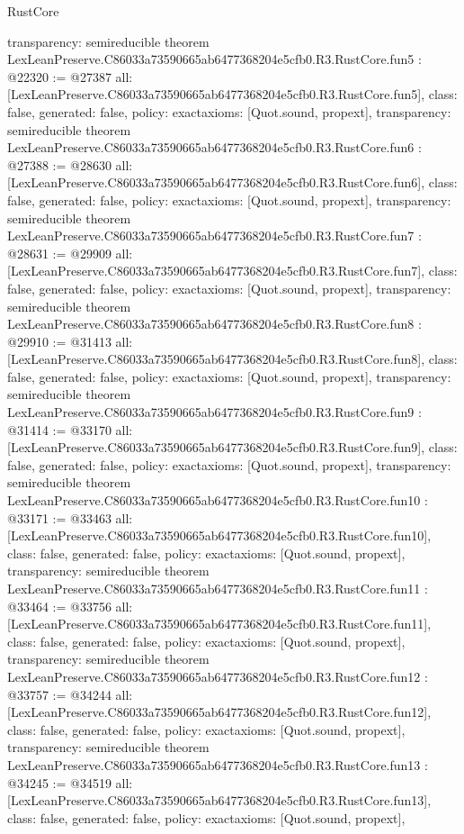 \begin{lexlean}{RustCore}
\begin{coremodule}
{  transparency: semireducible
}
theorem LexLeanPreserve.C86033a73590665ab6477368204e5cfb0.R3.RustCore.fun5 : @22320 := @27387 {
  all: [LexLeanPreserve.C86033a73590665ab6477368204e5cfb0.R3.RustCore.fun5],
  class: false,
  generated: false,
  policy: exact{axioms: [Quot.sound, propext]},
  transparency: semireducible
}
theorem LexLeanPreserve.C86033a73590665ab6477368204e5cfb0.R3.RustCore.fun6 : @27388 := @28630 {
  all: [LexLeanPreserve.C86033a73590665ab6477368204e5cfb0.R3.RustCore.fun6],
  class: false,
  generated: false,
  policy: exact{axioms: [Quot.sound, propext]},
  transparency: semireducible
}
theorem LexLeanPreserve.C86033a73590665ab6477368204e5cfb0.R3.RustCore.fun7 : @28631 := @29909 {
  all: [LexLeanPreserve.C86033a73590665ab6477368204e5cfb0.R3.RustCore.fun7],
  class: false,
  generated: false,
  policy: exact{axioms: [Quot.sound, propext]},
  transparency: semireducible
}
theorem LexLeanPreserve.C86033a73590665ab6477368204e5cfb0.R3.RustCore.fun8 : @29910 := @31413 {
  all: [LexLeanPreserve.C86033a73590665ab6477368204e5cfb0.R3.RustCore.fun8],
  class: false,
  generated: false,
  policy: exact{axioms: [Quot.sound, propext]},
  transparency: semireducible
}
theorem LexLeanPreserve.C86033a73590665ab6477368204e5cfb0.R3.RustCore.fun9 : @31414 := @33170 {
  all: [LexLeanPreserve.C86033a73590665ab6477368204e5cfb0.R3.RustCore.fun9],
  class: false,
  generated: false,
  policy: exact{axioms: [Quot.sound, propext]},
  transparency: semireducible
}
theorem LexLeanPreserve.C86033a73590665ab6477368204e5cfb0.R3.RustCore.fun10 : @33171 := @33463 {
  all: [LexLeanPreserve.C86033a73590665ab6477368204e5cfb0.R3.RustCore.fun10],
  class: false,
  generated: false,
  policy: exact{axioms: [Quot.sound, propext]},
  transparency: semireducible
}
theorem LexLeanPreserve.C86033a73590665ab6477368204e5cfb0.R3.RustCore.fun11 : @33464 := @33756 {
  all: [LexLeanPreserve.C86033a73590665ab6477368204e5cfb0.R3.RustCore.fun11],
  class: false,
  generated: false,
  policy: exact{axioms: [Quot.sound, propext]},
  transparency: semireducible
}
theorem LexLeanPreserve.C86033a73590665ab6477368204e5cfb0.R3.RustCore.fun12 : @33757 := @34244 {
  all: [LexLeanPreserve.C86033a73590665ab6477368204e5cfb0.R3.RustCore.fun12],
  class: false,
  generated: false,
  policy: exact{axioms: [Quot.sound, propext]},
  transparency: semireducible
}
theorem LexLeanPreserve.C86033a73590665ab6477368204e5cfb0.R3.RustCore.fun13 : @34245 := @34519 {
  all: [LexLeanPreserve.C86033a73590665ab6477368204e5cfb0.R3.RustCore.fun13],
  class: false,
  generated: false,
  policy: exact{axioms: [Quot.sound, propext]},
}
\end{coremodule}
\end{lexlean}
